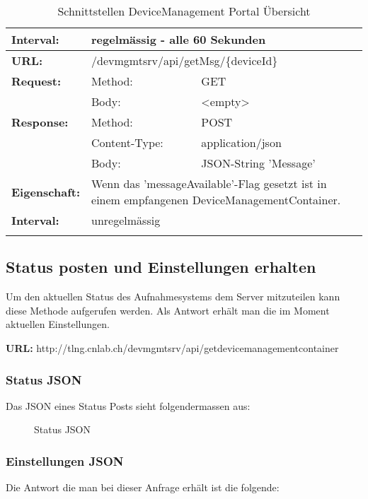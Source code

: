 {\begin{longtable}{ p{2.5cm} p{3.5cm} p{6cm}}
	\textbf{Interval:} &  \multicolumn{2}{p{10cm}}{regelmässig - alle 60 Sekunden}\\
\hline
\hline 
	\textbf{URL:} & \multicolumn{2}{p{10cm}}{/devmgmtsrv/api/getMsg/\{deviceId\}} \\
	\textbf{Request:} & Method: & GET \\
		& Body: & <empty> \\
	\textbf{Response:} & Method: & POST \\
		& Content-Type: & application/json \\
		& Body: & JSON-String 'Message' \\
	\textbf{Eigenschaft:} & \multicolumn{2}{p{10cm}}{ Wenn das 'messageAvailable'-Flag gesetzt ist in einem empfangenen DeviceManagementContainer.} \\
	\textbf{Interval:} & \multicolumn{2}{p{10cm}}{unregelmässig}\\
\hline
\hline 

\caption{Schnittstellen DeviceManagement Portal Übersicht}
\end{longtable} }

\pagebreak
\subsection{Status posten und Einstellungen erhalten}

Um den aktuellen Status des Aufnahmesystems dem Server mitzuteilen kann diese Methode aufgerufen werden. Als Antwort erhält man die im Moment aktuellen Einstellungen.

{\bf URL: }http://tlng.cnlab.ch/devmgmtsrv/api/getdevicemanagementcontainer 

\subsubsection{Status JSON}

Das JSON eines Status Posts sieht folgendermassen aus:

\begin{figure}[H]
	\centering
	
	\caption{Status JSON}
\end{figure}


\pagebreak
\subsubsection{Einstellungen JSON}

Die Antwort die man bei dieser Anfrage erhält ist die folgende:

